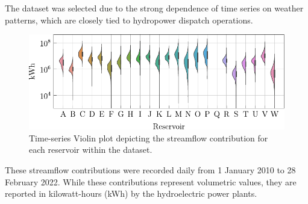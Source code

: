 \begin{frame}
	The dataset was selected due to the strong dependence of time series on weather patterns, which are closely tied to hydropower dispatch operations.
	
	\begin{figure}[htbp]
		\centering
		\includegraphics[height=0.25\textwidth]{images/ct_violinplot.pdf}
		\caption{Time-series Violin plot depicting the streamflow contribution for each reservoir within the dataset.}
	\end{figure}	
	
	These streamflow contributions were recorded daily from 1 January 2010 to 28 February 2022. While these contributions represent volumetric values, they are reported in kilowatt-hours (kWh) by the hydroelectric power plants.
\end{frame}
